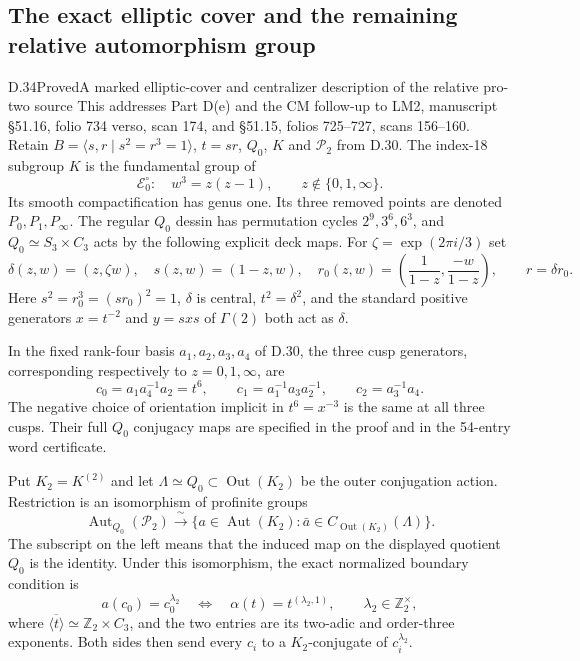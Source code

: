 \subsection{The exact elliptic cover and the remaining relative automorphism group}

\begin{statement}{D.34}{Proved}{A marked elliptic-cover and centralizer description of the relative pro-two source}
This addresses Part D(e) and the CM follow-up to LM2, manuscript
\S51.16, folio 734 verso, scan 174, and \S51.15, folios 725--727,
scans 156--160. Retain $B=\langle s,r\mid s^2=r^3=1\rangle$,
$t=sr$, $Q_0$, $K$ and $\mathcal P_2$ from D.30.
The index-18 subgroup $K$ is the fundamental group of
\[
 \mathcal E_0^\circ:\quad w^3=z(z-1),\qquad
 z\notin\{0,1,\infty\}.                              \tag{D.34.1}
\]
Its smooth compactification has genus one. Its three removed points
are denoted $P_0,P_1,P_\infty$. The regular $Q_0$ dessin has
permutation cycles $2^9,3^6,6^3$, and $Q_0\simeq S_3\times C_3$ acts
by the following explicit deck maps. For
$\zeta=\exp(2\pi i/3)$ set
\[
 \delta(z,w)=(z,\zeta w),\quad
 s(z,w)=(1-z,w),\quad
 r_0(z,w)=\left(\frac1{1-z},\frac{-w}{1-z}\right),
 \qquad r=\delta r_0.                                 \tag{D.34.2}
\]
Here $s^2=r_0^3=(sr_0)^2=1$, $\delta$ is central,
$t^2=\delta^2$, and the standard positive generators
$x=t^{-2}$ and $y=sxs$ of $\Gamma(2)$ both act as $\delta$.

In the fixed rank-four basis $a_1,a_2,a_3,a_4$ of D.30, the three
cusp generators, corresponding respectively to $z=0,1,\infty$, are
\[
 c_0=a_1a_4^{-1}a_2=t^6,\qquad
 c_1=a_1^{-1}a_3a_2^{-1},\qquad
 c_2=a_3^{-1}a_4.                                     \tag{D.34.3}
\]
The negative choice of orientation implicit in $t^6=x^{-3}$ is the
same at all three cusps. Their full $Q_0$ conjugacy maps are specified
in the proof and in the 54-entry word certificate.

Put $K_2=K^{(2)}$ and let
$\Lambda\simeq Q_0\subset\operatorname{Out}(K_2)$ be the outer
conjugation action. Restriction is an isomorphism of profinite groups
\[
 \operatorname{Aut}_{Q_0}(\mathcal P_2)
 \xrightarrow{\ \sim\ }
 \{a\in\operatorname{Aut}(K_2):\bar a\in
                C_{\operatorname{Out}(K_2)}(\Lambda)\}.          \tag{D.34.4}
\]
The subscript on the left means that the induced map on the displayed
quotient $Q_0$ is the identity. Under this isomorphism, the exact
normalized boundary condition is
\[
 a(c_0)=c_0^{\lambda_2}
 \quad\Longleftrightarrow\quad
 \alpha(t)=t^{(\lambda_2,1)},\qquad
 \lambda_2\in\mathbb Z_2^\times,                     \tag{D.34.5}
\]
where $\overline{\langle t\rangle}\simeq
\mathbb Z_2\times C_3$, and the two entries are its two-adic and
order-three exponents. Both sides then send every $c_i$ to a
$K_2$-conjugate of $c_i^{\lambda_2}$.


\end{statement}
